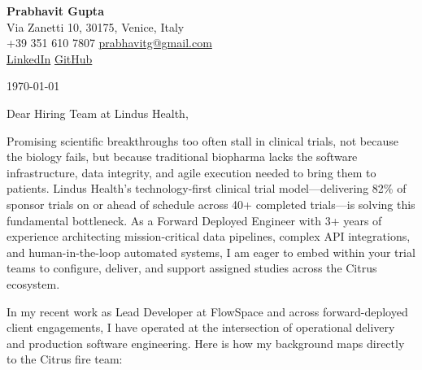\documentclass[11pt,a4paper]{article}
\begin{document}
\begin{center}
    {\huge \textbf{Prabhavit Gupta}} \\
    \vspace{4pt}
    Via Zanetti 10, 30175, Venice, Italy \\
    +39 351 610 7807 \textbar{} \href{mailto:prabhavitg@gmail.com}{prabhavitg@gmail.com} \\
    \href{https://www.linkedin.com/in/prabhavit/}{LinkedIn} \textbar{} \href{https://github.com/prab-gupta}{GitHub}
\end{center}

\vspace{18pt}

\noindent \today

\vspace{10pt}

\noindent Dear Hiring Team at Lindus Health,

\vspace{8pt}

\noindent Promising scientific breakthroughs too often stall in clinical trials, not because the biology fails, but because traditional biopharma lacks the software infrastructure, data integrity, and agile execution needed to bring them to patients. Lindus Health's technology-first clinical trial model---delivering 82\% of sponsor trials on or ahead of schedule across 40+ completed trials---is solving this fundamental bottleneck. As a Forward Deployed Engineer with 3+ years of experience architecting mission-critical data pipelines, complex API integrations, and human-in-the-loop automated systems, I am eager to embed within your trial teams to configure, deliver, and support assigned studies across the Citrus ecosystem.

\vspace{6pt}

\noindent In my recent work as Lead Developer at FlowSpace and across forward-deployed client engagements, I have operated at the intersection of operational delivery and production software engineering. Here is how my background maps directly to the Citrus fire team:
\end{document}
